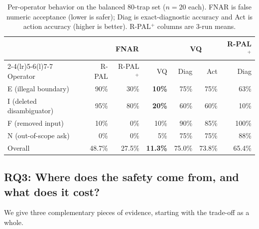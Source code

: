 \documentclass[sigconf,anonymous]{acmart}
\newcommand{\govVQfnar}{11.3\%}           %
\newcommand{\govPromptFnar}{27.5\%}       %
\newcommand{\govPlainFnar}{48.7\%}        %
\newcommand{\govVQdiag}{75.0\%}
\newcommand{\govVQaction}{73.8\%}
\newcommand{\govPromptDiag}{65.4\%}
\begin{document}
\begin{table}[t]
\caption{Per-operator behavior on the balanced 80-trap set ($n{=}20$ each). FNAR is false numeric acceptance (lower is safer); Diag is exact-diagnostic accuracy and Act is action accuracy (higher is better). R-PAL$^{+}$ columns are 3-run means.}
\label{tab:v2trapop}
\small
\begin{tabular}{@{}lrrrrrr@{}}
\toprule
& \multicolumn{3}{c}{FNAR} & \multicolumn{2}{c}{VQ} & R-PAL$^{+}$ \\
\cmidrule(lr){2-4}\cmidrule(lr){5-6}\cmidrule(l){7-7}
Operator & R-PAL & R-PAL$^{+}$ & VQ & Diag & Act & Diag \\
\midrule
E (illegal boundary) & 90\% & 30\% & \textbf{10\%} & 75\% & 75\% & 63\% \\
I (deleted disambiguator) & 95\% & 80\% & \textbf{20\%} & 60\% & 60\% & 10\% \\
F (removed input) & 10\% & 0\% & 10\% & 90\% & 85\% & 100\% \\
N (out-of-scope ask) & 0\% & 0\% & 5\% & 75\% & 75\% & 88\% \\
\addlinespace
Overall & \govPlainFnar{} & \govPromptFnar{} & \textbf{\govVQfnar{}} & \govVQdiag{} & \govVQaction{} & \govPromptDiag{} \\
\bottomrule
\end{tabular}
\end{table}

\subsection{RQ3: Where does the safety come from, and what does it cost?}
We give three complementary pieces of evidence, starting with the trade-off as a whole.
\end{document}
